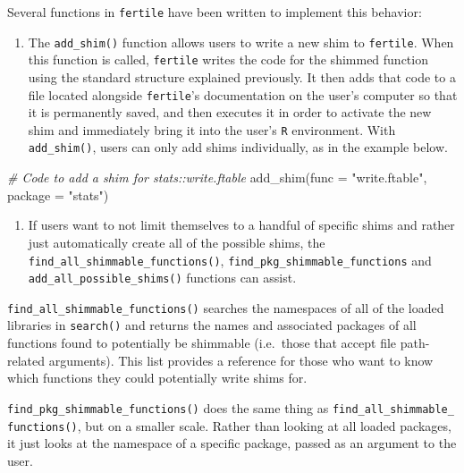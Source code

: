 \documentclass[12pt,twoside]{reedthesis}
\newenvironment{Shaded}{\begin{snugshade}}{\end{snugshade}}
\newcommand{\AttributeTok}[1]{\textcolor[rgb]{0.77,0.63,0.00}{#1}}
\newcommand{\CommentTok}[1]{\textcolor[rgb]{0.56,0.35,0.01}{\textit{#1}}}
\newcommand{\FunctionTok}[1]{\textcolor[rgb]{0.00,0.00,0.00}{#1}}
\newcommand{\NormalTok}[1]{#1}
\newcommand{\StringTok}[1]{\textcolor[rgb]{0.31,0.60,0.02}{#1}}
\providecommand{\tightlist}{%
  \setlength{\itemsep}{0pt}\setlength{\parskip}{0pt}}
\begin{document}
Several functions in \texttt{fertile} have been written to implement this behavior:
\begin{enumerate}
\def\labelenumi{\arabic{enumi}.}
\tightlist
\item
  The \texttt{add\_shim()} function allows users to write a new shim to \texttt{fertile}. When this function is called, \texttt{fertile} writes the code for the shimmed function using the standard structure explained previously. It then adds that code to a file located alongside \texttt{fertile}'s documentation on the user's computer so that it is permanently saved, and then executes it in order to activate the new shim and immediately bring it into the user's \texttt{R} environment. With \texttt{add\_shim()}, users can only add shims individually, as in the example below.
\end{enumerate}
\begin{Shaded}
\begin{Highlighting}[]
\CommentTok{\# Code to add a shim for stats::write.ftable }
\FunctionTok{add\_shim}\NormalTok{(}\AttributeTok{func =} \StringTok{"write.ftable"}\NormalTok{, }\AttributeTok{package =} \StringTok{"stats"}\NormalTok{)}
\end{Highlighting}
\end{Shaded}
\begin{enumerate}
\def\labelenumi{\arabic{enumi}.}
\setcounter{enumi}{1}
\tightlist
\item
  If users want to not limit themselves to a handful of specific shims and rather just automatically create all of the possible shims, the \texttt{find\_all\_shimmable\_functions()}, \texttt{find\_pkg\_shimmable\_functions} and \texttt{add\_all\_possible\_shims()} functions can assist.
\end{enumerate}
\texttt{find\_all\_shimmable\_functions()} searches the namespaces of all of the loaded libraries in \texttt{search()} and returns the names and associated packages of all functions found to potentially be shimmable (i.e.~those that accept file path-related arguments). This list provides a reference for those who want to know which functions they could potentially write shims for.

\texttt{find\_pkg\_shimmable\_functions()} does the same thing as \texttt{find\_all\_shimmable\_}
\texttt{functions()}, but on a smaller scale. Rather than looking at all loaded packages, it just looks at the namespace of a specific package, passed as an argument to the user.
\end{document}
